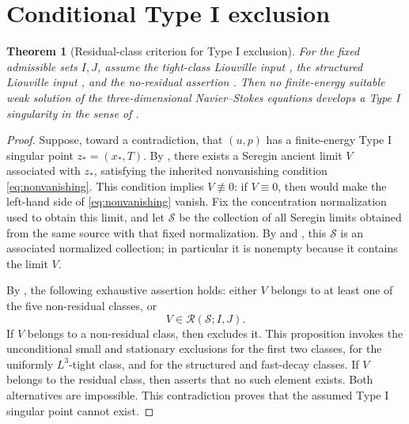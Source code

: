 \documentclass[11pt]{amsart}
\theoremstyle{plain}
\newtheorem{theorem}{Theorem}[section]
\theoremstyle{definition}
\theoremstyle{remark}
\numberwithin{equation}{section}
\begin{document}
\section{Conditional Type I exclusion}

\begin{theorem}[Residual-class criterion for Type I exclusion]\label{thm:full-type-i}
For the fixed admissible sets \(I,J\), assume the tight-class Liouville input
, the structured Liouville input
, and the no-residual assertion
.  Then no finite-energy suitable weak solution of the
three-dimensional Navier--Stokes equations develops a Type I singularity in the
sense of .
\end{theorem}

\begin{proof}
Suppose, toward a contradiction, that \((u,p)\) has a finite-energy Type I
singular point \(z_*=(x_*,T)\).  By , there
exists a Seregin ancient limit \(V\) associated with \(z_*\), satisfying the
inherited nonvanishing condition \eqref{eq:nonvanishing}.  This condition
implies \(V\not\equiv0\): if \(V\equiv0\), then
 would make the left-hand side of
\eqref{eq:nonvanishing} vanish.  Fix the concentration normalization used to
obtain this limit, and let \(\mathcal S\) be the collection of all Seregin
limits obtained from the same source with that fixed normalization.  By
 and
, this \(\mathcal S\) is an associated normalized
collection; in particular it is nonempty because it contains the limit \(V\).

By , the following exhaustive assertion holds: either
\(V\) belongs to at least one of the five non-residual classes, or
\[
   V\in\mathcal R(\mathcal S;I,J).
\]
If \(V\) belongs to a non-residual class, then
 excludes it.  This proposition invokes the
unconditional small and stationary exclusions for the first two classes,
 for the uniformly \(L^3\)-tight class, and
 for the structured and fast-decay classes.
If \(V\) belongs to the residual class, then
 asserts that no such element exists.  Both alternatives
are impossible.  This contradiction proves that the assumed Type I singular
point cannot exist.
\end{proof}
\end{document}
